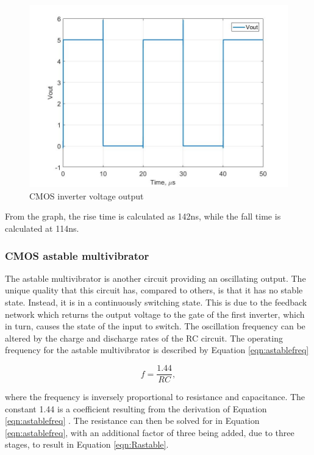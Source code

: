 \begin{figure}[H]
    \centering
        \centering
        \includegraphics[scale = .3]{CircuitDevelopment/cd4007SIM/Vout_cascade_cmos.jpg}
        \caption{CMOS inverter voltage output}
        \label{fig:VoutInvert}
\end{figure} 

From the graph, the rise time is calculated as 142ns, while the fall time is calculated at 114ns. 

\subsubsection{CMOS astable multivibrator}

The astable multivibrator is another circuit providing an oscillating output. The unique quality that this circuit has, compared to others, is that it has no stable state. Instead, it is in a continuously switching state. This is due to the feedback network which returns the output voltage to the gate of the first inverter, which in turn, causes the state of the input to switch. The oscillation frequency can be altered by the charge and discharge rates of the RC circuit. The operating frequency for the astable multivibrator is described by Equation \ref{eqn:astablefreq} \cite{b3} 

\begin{equation}
f = \frac{1.44}{RC},
\label{eqn:astablefreq}
\end{equation}

where the frequency is inversely proportional to resistance and capacitance. The constant 1.44 is a coefficient resulting from the derivation of Equation \ref{eqn:astablefreq} \cite{b3}.  The resistance can then be solved for in Equation \ref{eqn:astablefreq}, with an additional factor of three being added, due to three stages, to result in Equation \ref{eqn:Rastable}.

